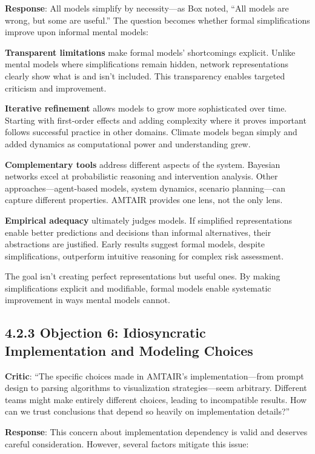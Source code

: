 \documentclass[
  11pt,
  letterpaper,
]{book}
\begin{document}
\textbf{Response}: All models simplify by necessity---as Box noted,
``All models are wrong, but some are useful.'' The question becomes
whether formal simplifications improve upon informal mental models:

\textbf{Transparent limitations} make formal models' shortcomings
explicit. Unlike mental models where simplifications remain hidden,
network representations clearly show what is and isn't included. This
transparency enables targeted criticism and improvement.

\textbf{Iterative refinement} allows models to grow more sophisticated
over time. Starting with first-order effects and adding complexity where
it proves important follows successful practice in other domains.
Climate models began simply and added dynamics as computational power
and understanding grew.

\textbf{Complementary tools} address different aspects of the system.
Bayesian networks excel at probabilistic reasoning and intervention
analysis. Other approaches---agent-based models, system dynamics,
scenario planning---can capture different properties. AMTAIR provides
one lens, not the only lens.

\textbf{Empirical adequacy} ultimately judges models. If simplified
representations enable better predictions and decisions than informal
alternatives, their abstractions are justified. Early results suggest
formal models, despite simplifications, outperform intuitive reasoning
for complex risk assessment.

The goal isn't creating perfect representations but useful ones. By
making simplifications explicit and modifiable, formal models enable
systematic improvement in ways mental models cannot.

\subsection{4.2.3 Objection 6: Idiosyncratic Implementation and Modeling
Choices}\label{sec-idiosyncratic}

\textbf{Critic}: ``The specific choices made in AMTAIR's
implementation---from prompt design to parsing algorithms to
visualization strategies---seem arbitrary. Different teams might make
entirely different choices, leading to incompatible results. How can we
trust conclusions that depend so heavily on implementation details?''

\textbf{Response}: This concern about implementation dependency is valid
and deserves careful consideration. However, several factors mitigate
this issue:
\end{document}
